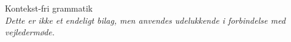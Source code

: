 Kontekst-fri grammatik\\

\noindent \textit{Dette er ikke et endeligt bilag, men anvendes udelukkende i forbindelse med vejledermøde.}

